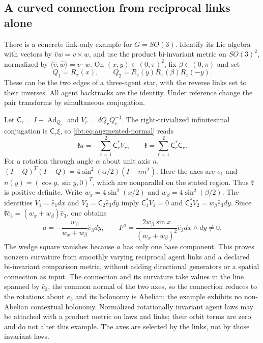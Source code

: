 \subsection{A curved connection from reciprocal links alone}

There is a concrete link-only example for $G=SO(3)$. Identify its Lie algebra with vectors by $\widehat v w=v\times w$, and use the product bi-invariant metric on $SO(3)^2$, normalized by $\langle\widehat v,\widehat w\rangle=v\cdot w$. On $(x,y)\in(0,\pi)^2$, fix $\beta\in(0,\pi)$ and set
\begin{equation}
 Q_1=R_x(x),\qquad Q_2=R_z(y)R_x(\beta)R_z(-y).
 \label{ibt:eq:SO3-links}
\end{equation}
These can be the two edges of a three-agent star, with the reverse links set to their inverses. All agent backtracks are the identity. Under reference change the pair transforms by simultaneous conjugation.

Let $\mathsf C_r=I-\operatorname{Ad}_{Q_r}$ and $V_r=d Q_r Q_r^{-1}$. The right-trivialized infinitesimal conjugation is $\mathsf C_r\xi$, so \cref{ibt:eq:augmented-normal} reads
\begin{equation}
 \mathfrak k a=-\sum_{r=1}^2 \mathsf C_r^*V_r,\qquad
 \mathfrak k=\sum_{r=1}^2 \mathsf C_r^*\mathsf C_r.
 \label{ibt:eq:SO3-normal}
\end{equation}
For a rotation through angle $\alpha$ about unit axis $n$,
$(I-Q)^T(I-Q)=4\sin^2(\alpha/2)(I-nn^T)$. Here the axes are $e_1$ and $n(y)=(\cos y,\sin y,0)^T$, which are nonparallel on the stated region. Thus $\mathfrak k$ is positive definite. Write $w_x=4\sin^2(x/2)$ and $w_\beta=4\sin^2(\beta/2)$. The identities
$V_1=\widehat e_1d x$ and $V_2=\mathsf C_2\widehat e_3d y$ imply $\mathsf C_1^*V_1=0$ and $\mathsf C_2^*V_2=w_\beta\widehat e_3d y$. Since $\mathfrak k\widehat e_3=(w_x+w_\beta)\widehat e_3$, one obtains
\begin{equation}
 a=-\frac{w_\beta}{w_x+w_\beta}\widehat e_3d y,\qquad
 F^a=\frac{2w_\beta\sin x}{(w_x+w_\beta)^2}\widehat e_3d x\wedge d y\ne0.
 \label{ibt:eq:SO3-curvature}
\end{equation}
The wedge square vanishes because $a$ has only one base component. This proves nonzero curvature from smoothly varying reciprocal agent links and a declared bi-invariant comparison metric, without adding directional generators or a spatial connection as input. The connection and its curvature take values in the line spanned by $\widehat e_3$, the common normal of the two axes, so the connection reduces to the rotations about $e_3$ and its holonomy is Abelian; the example exhibits no non-Abelian contextual holonomy. Normalized rotationally invariant agent laws may be attached with a product metric on laws and links; their orbit terms are zero and do not alter this example. The axes are selected by the links, not by those invariant laws.

